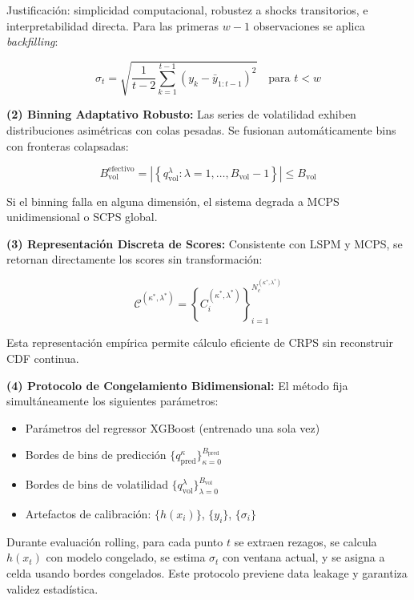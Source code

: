 Justificación: simplicidad computacional, robustez a shocks transitorios, e interpretabilidad directa. Para las primeras $w-1$ observaciones se aplica \textit{backfilling}:

\begin{equation}
\hat{\sigma}_t = \sqrt{\frac{1}{t-2} \sum_{k=1}^{t-1} (y_k - \bar{y}_{1:t-1})^2} \quad \text{para } t < w
\end{equation}

\textbf{(2) Binning Adaptativo Robusto:} Las series de volatilidad exhiben distribuciones asimétricas con colas pesadas. Se fusionan automáticamente bins con fronteras colapsadas:

\begin{equation}
B_{\text{vol}}^{\text{efectivo}} = \left|\left\{q_{\text{vol}}^{\lambda} : \lambda = 1, \ldots, B_{\text{vol}}-1\right\}\right| \leq B_{\text{vol}}
\end{equation}

Si el binning falla en alguna dimensión, el sistema degrada a MCPS unidimensional o SCPS global.

\textbf{(3) Representación Discreta de Scores:} Consistente con LSPM y MCPS, se retornan directamente los scores sin transformación:

\begin{equation}
\mathcal{C}^{(\kappa^*,\lambda^*)} = \left\{C_i^{(\kappa^*,\lambda^*)}\right\}_{i=1}^{N_c^{(\kappa^*,\lambda^*)}}
\end{equation}

Esta representación empírica permite cálculo eficiente de CRPS sin reconstruir CDF continua.

\textbf{(4) Protocolo de Congelamiento Bidimensional:} El método fija simultáneamente los siguientes parámetros:

\begin{itemize}
\item Parámetros del regressor XGBoost (entrenado una sola vez)
\item Bordes de bins de predicción $\{q_{\text{pred}}^{\kappa}\}_{\kappa=0}^{B_{\text{pred}}}$
\item Bordes de bins de volatilidad $\{q_{\text{vol}}^{\lambda}\}_{\lambda=0}^{B_{\text{vol}}}$
\item Artefactos de calibración: $\{h(x_i)\}$, $\{y_i\}$, $\{\sigma_i\}$
\end{itemize}

Durante evaluación rolling, para cada punto $t$ se extraen rezagos, se calcula $h(x_t)$ con modelo congelado, se estima $\sigma_t$ con ventana actual, y se asigna a celda usando bordes congelados. Este protocolo previene data leakage y garantiza validez estadística.

